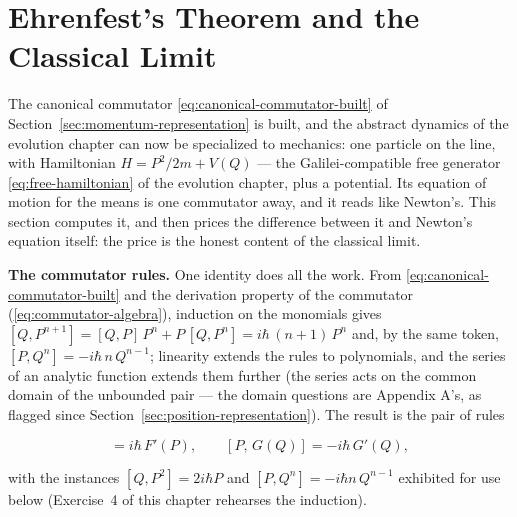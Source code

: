 \section{Ehrenfest's Theorem and the Classical Limit}
\label{sec:ehrenfest}

The canonical commutator \eqref{eq:canonical-commutator-built} of Section~\ref{sec:momentum-representation} is built, and the abstract dynamics of the evolution chapter can now be specialized to mechanics: one particle on the line, with Hamiltonian $H = P^2/2m + V(Q)$ --- the Galilei-compatible free generator \eqref{eq:free-hamiltonian} of the evolution chapter, plus a potential. Its equation of motion for the means is one commutator away, and it reads like Newton's. This section computes it, and then prices the difference between it and Newton's equation itself: the price is the honest content of the classical limit.

\textbf{The commutator rules.} One identity does all the work. From \eqref{eq:canonical-commutator-built} and the derivation property of the commutator (\eqref{eq:commutator-algebra}), induction on the monomials gives $[Q,P^{n+1}] = [Q,P]\,P^n + P\,[Q,P^n] = i\hbar\,(n+1)\,P^n$ and, by the same token, $[P,Q^n] = -i\hbar\,n\,Q^{n-1}$; linearity extends the rules to polynomials, and the series of an analytic function extends them further (the series acts on the common domain of the unbounded pair --- the domain questions are Appendix A's, as flagged since Section~\ref{sec:position-representation}). The result is the pair of rules
\begin{linenomath}
    \begin{equation}
        [Q,\,F(P)] = i\hbar\,F'(P),
        \qquad
        [P,\,G(Q)] = -i\hbar\,G'(Q),
        \label{eq:qp-commutator-rules}
    \end{equation}
\end{linenomath}
with the instances $[Q,P^2] = 2i\hbar P$ and $[P,Q^n] = -i\hbar n\,Q^{n-1}$ exhibited for use below (Exercise~4 of this chapter rehearses the induction).

